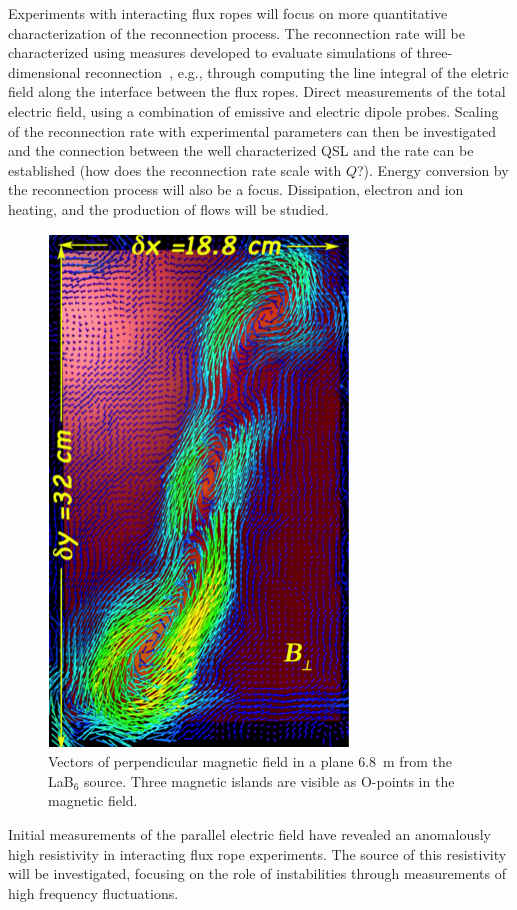 \documentclass[11pt]{article}
\renewcommand{\cite}{\citep}
\begin{document}
Experiments with interacting flux ropes will focus on more
quantitative characterization of the reconnection process.  The
reconnection rate will be characterized using measures developed to
evaluate simulations of three-dimensional
reconnection~\cite{finn:2014,daughton:2014}, e.g., through computing
the line integral of the eletric field along the interface between the
flux ropes. Direct measurements of the total electric field, using a
combination of emissive and electric dipole probes.  Scaling of the
reconnection rate with experimental parameters can then be investigated
and the connection between the well characterized QSL and the rate can
be established (how does the reconnection rate scale with $Q$?).
Energy conversion by the reconnection process will also be a focus.
Dissipation, electron and ion heating, and the production of flows
will be studied.  
\begin{figure}
\begin{center}
\includegraphics[width=3.0truein]{tearing}
\caption{Vectors of perpendicular magnetic field in a plane 6.8~m from
  the LaB$_6$ source.  Three magnetic islands are visible as O-points
  in the magnetic field.}\label{tearing}
\end{center}
\end{figure}
Initial measurements of the parallel electric field
have revealed an anomalously high resistivity in interacting flux rope
experiments.  The source of this resistivity will be investigated,
focusing on the role of instabilities through measurements of high
frequency fluctuations.
\end{document}
